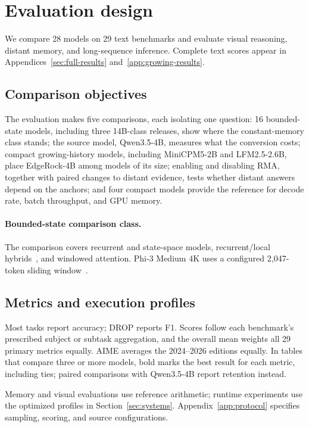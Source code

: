 \FloatBarrier
\section{Evaluation design}
\label{sec:evaluation}

We compare 28 models on 29 text benchmarks and evaluate visual reasoning, distant memory, and long-sequence inference. Complete text scores appear in Appendices~\ref{sec:full-results} and~\ref{app:growing-results}.

\subsection{Comparison objectives}
The evaluation makes five comparisons, each isolating one question: 16 bounded-state models, including three 14B-class releases, show where the constant-memory class stands; the source model, Qwen3.5-4B, measures what the conversion costs; compact growing-history models, including MiniCPM5-2B and LFM2.5-2.6B, place EdgeRock-4B among models of its size; enabling and disabling RMA, together with paired changes to distant evidence, tests whether distant answers depend on the anchors; and four compact models provide the reference for decode rate, batch throughput, and GPU memory.

\paragraph{Bounded-state comparison class.}
The comparison covers recurrent and state-space models, recurrent/local hybrids~\cite{rwkv7,rwkvg1,radlads,arwkv,ahn,falcon3,recurrentgemma,xlstm7b}, and windowed attention. Phi-3 Medium 4K uses a configured 2,047-token sliding window~\cite{phi3window}.

\subsection{Metrics and execution profiles}
Most tasks report accuracy; DROP reports F1. Scores follow each benchmark's prescribed subject or subtask aggregation, and the overall mean weights all 29 primary metrics equally. AIME averages the 2024--2026 editions equally. In tables that compare three or more models, bold marks the best result for each metric, including ties; paired comparisons with Qwen3.5-4B report retention instead.

Memory and visual evaluations use reference arithmetic; runtime experiments use the optimized profiles in Section~\ref{sec:systems}. Appendix~\ref{app:protocol} specifies sampling, scoring, and source configurations.
